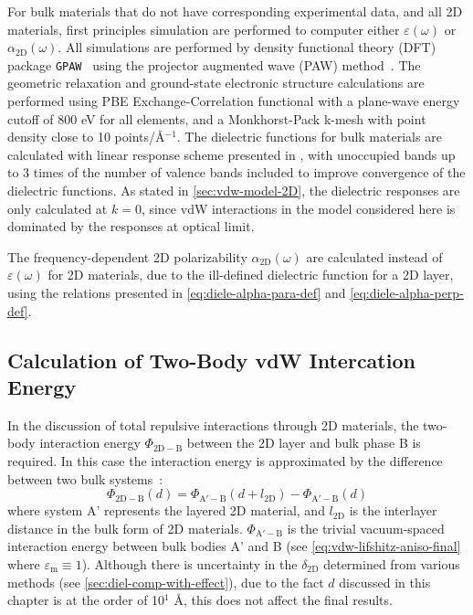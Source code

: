 For bulk materials that do not have corresponding experimental data,
and all 2D materials, first principles simulation are performed to
computer either $\varepsilon(\omega)$ or
$\alpha_{\mathrm{2D}}(\omega)$. All simulations are performed by
density functional theory (DFT) package \texttt{GPAW}~\cite{Mortensen_2005_gpaw}
using the projector augmented wave (PAW)
method~\cite{Blochl_1994_PW}.
%
The geometric relaxation and ground-state electronic structure
calculations are performed using PBE Exchange-Correlation
functional\cite{Perdew_1996_GGA} with a plane-wave energy
cutoff of 800 eV for all elements, and a Monkhorst-Pack k-mesh with
point density close to 10 points/\AA{}$^{-1}$.
%
The dielectric functions for bulk materials are calculated with linear
response scheme presented in \cite{Gajdos_2006_opt_PAW}, with
unoccupied bands up to 3 times of the number of valence bands included
to improve convergence of the dielectric functions.
%
As stated in \autoref{sec:vdw-model-2D}, the dielectric responses are
only calculated at $k = 0$, since vdW interactions in the model
considered here is dominated by the responses at optical limit.

The frequency-dependent 2D polarizability
$\alpha_{\mathrm{2D}}(\omega)$ are calculated instead of
$\varepsilon(\omega)$ for 2D materials, due to the ill-defined
dielectric function for a 2D layer, using the relations presented in
\autoref{eq:diele-alpha-para-def} and
\autoref{eq:diele-alpha-perp-def}.

\subsection{Calculation of Two-Body vdW Intercation Energy}
\label{sec:calculation-two-body}

In the discussion of total repulsive interactions through 2D
materials, the two-body interaction energy $\Phi_{\mathrm{2D-B}}$
between the 2D layer and bulk phase B is required. In this case the
interaction energy is approximated by the difference between two bulk
systems~\cite{parsegian_van_2010_book}:
\begin{equation}
  \label{eq:vdw-phi-2D-B}
  \Phi_{\mathrm{2D - B}}(d) = \Phi_{\mathrm{A'-B}}(d + l_{\mathrm{2D}}) - \Phi_{\mathrm{A'-B}}(d)
\end{equation}
where system A' represents the layered 2D material, and
$l_{\mathrm{2D}}$ is the inter\-layer distance in the bulk form
of 2D materials. $\Phi_{\mathrm{A'-B}}$ is the trivial vacuum-spaced
interaction energy between bulk bodies A' and B (see
\autoref{eq:vdw-lifshitz-aniso-final} where
$\varepsilon_{\mathrm{m}} \equiv 1$).
%
Although there is uncertainty in the $\delta_{\mathrm{2D}}$ determined
from various methods (see \autoref{sec:diel-comp-with-effect}), due to
the fact $d$ discussed in this chapter is at the order of 10$^{1}$
\AA{}, this does not affect the final results.


